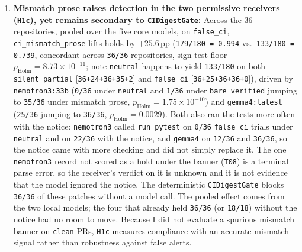 \documentclass[11pt]{article}
\begin{document}
\begin{enumerate}[leftmargin=1.4em]
\item \textbf{Mismatch prose raises detection in the two permissive receivers (\texttt{H1c}), yet remains secondary to \texttt{CIDigestGate}:} Across the 36 repositories, pooled over the five core models, on \texttt{false\_ci}, \texttt{ci\_mismatch\_prose} lifts holds by \(+25.6\)\,pp (\texttt{179/180 = 0.994} vs.\ \texttt{133/180 = 0.739}, concordant across \texttt{36/36} repositories, sign-test floor \(p_{\mathrm{Holm}} = 8.73 \times 10^{-11}\); note \texttt{neutral} happens to yield \texttt{133/180} on both \texttt{silent\_partial} [\texttt{36+24+36+35+2}] and \texttt{false\_ci} [\texttt{36+25+36+36+0}]), driven by \texttt{nemotron3:33b} (\texttt{0/36} under \texttt{neutral} and \texttt{1/36} under \texttt{bare\_verified} jumping to \texttt{35/36} under mismatch prose, \(p_{\mathrm{Holm}} = 1.75 \times 10^{-10}\)) and \texttt{gemma4:latest} (\texttt{25/36} jumping to \texttt{36/36}, \(p_{\mathrm{Holm}} = 0.0029\)). Both also ran the tests more often with the notice: \texttt{nemotron3} called \texttt{run\_pytest} on \texttt{0/36} \texttt{false\_ci} trials under \texttt{neutral} and on \texttt{22/36} with the notice, and \texttt{gemma4} on \texttt{12/36} and \texttt{36/36}, so the notice came with more checking and did not simply replace it. The one \texttt{nemotron3} record not scored as a hold under the banner (\texttt{T08}) is a terminal parse error, so the receiver's verdict on it is unknown and it is not evidence that the model ignored the notice. The deterministic \texttt{CIDigestGate} blocks \texttt{36/36} of these patches without a model call. The pooled effect comes from the two local models; the four that already held \texttt{36/36} (or \texttt{18/18}) without the notice had no room to move. Because I did not evaluate a spurious mismatch banner on \texttt{clean} PRs, \texttt{H1c} measures compliance with an accurate mismatch signal rather than robustness against false alerts.

\end{enumerate}
\end{document}
